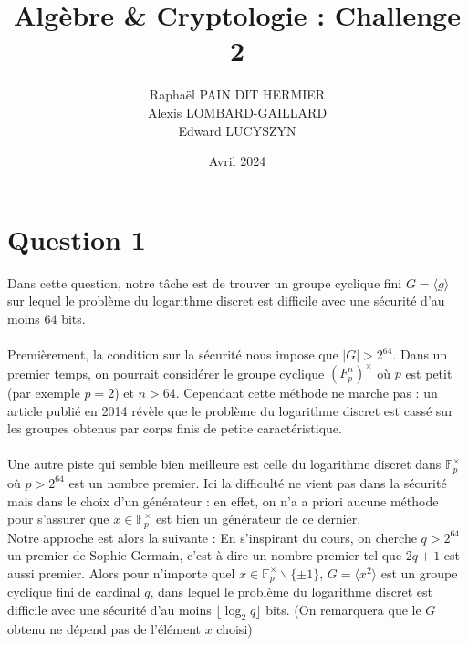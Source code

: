 \documentclass{article}
\title{Algèbre \& Cryptologie : Challenge 2}
\author{Raphaël PAIN DIT HERMIER\\
Alexis LOMBARD-GAILLARD\\
Edward LUCYSZYN}
\date{Avril 2024}
\begin{document}


\tableofcontents

\newpage
\section{Question 1}

Dans cette question, notre tâche est de trouver un groupe cyclique fini $G = \langle g\rangle$ sur lequel le problème du logarithme discret est difficile avec une sécurité d'au moins $64$ bits.\\ \\
Premièrement, la condition sur la sécurité nous impose que $|G| > 2^{64}$. Dans un premier temps, on pourrait considérer le groupe cyclique $(F_p^n)^\times$ où $p$ est petit (par exemple $p = 2$) et $n>64$. Cependant cette méthode ne marche pas : un article publié en 2014 \cite{2} révèle que le problème du logarithme discret est cassé sur les groupes obtenus par corps finis de petite caractéristique.\\ \\
Une autre piste qui semble bien meilleure est celle du logarithme discret dans $\mathbb{F}_p^\times$ où $p > 2^64$ est un nombre premier. Ici la difficulté ne vient pas dans la sécurité mais dans le choix d'un générateur : en effet, on n'a a priori aucune méthode pour s'assurer que $x\in \mathbb{F}_p^\times$ est bien un générateur de ce dernier.\\

Notre approche est alors la suivante : En s'inspirant du cours, on cherche $q > 2^{64}$ un premier de Sophie-Germain, c'est-à-dire un nombre premier tel que $2q+1$ est aussi premier. Alors pour n'importe quel $x\in \mathbb{F}_p^\times \backslash \{\pm 1\}$, $G = \langle x^2 \rangle$ est un groupe cyclique fini de cardinal $q$, dans lequel le problème du logarithme discret est difficile avec une sécurité d'au moins $\lfloor \log_2 q \rfloor$ bits. (On remarquera que le $G$ obtenu ne dépend pas de l'élément $x$ choisi)\\
\end{document}
